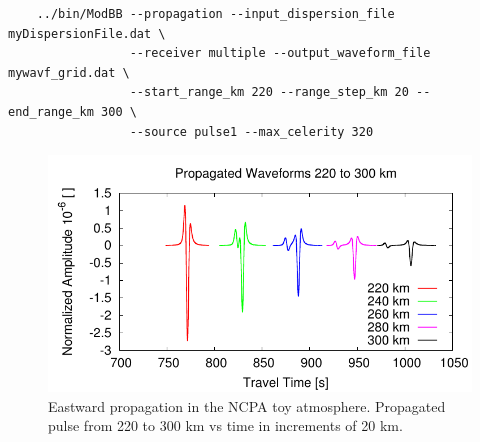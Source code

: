 \begin{verbatim}
    ../bin/ModBB --propagation --input_dispersion_file myDispersionFile.dat \
                 --receiver multiple --output_waveform_file mywavf_grid.dat \
                 --start_range_km 220 --range_step_km 20 --end_range_km 300 \
                 --source pulse1 --max_celerity 320
\end{verbatim}

\begin{figure}
\begin{center}
\includegraphics[scale=0.65]{figs/modbb_ex_prop_pulse_grid}
\end{center}
\caption{Eastward propagation in the NCPA toy atmosphere. Propagated pulse from 220 to 300 km vs time in increments of 20 km.}
\label{fig: modbb ex prop 220 to 300 km}
\end{figure}

